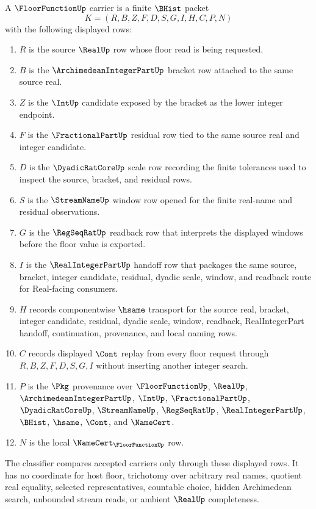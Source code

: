 \begin{definition}
\label{def:floor-function-carrier}
A $\FloorFunctionUp$ carrier is a finite $\BHist$ packet
$$
K=(R,B,Z,F,D,S,G,I,H,C,P,N)
$$
with the following displayed rows:
\begin{enumerate}
\item $R$ is the source $\RealUp$ row whose floor read is being requested.
\item $B$ is the $\ArchimedeanIntegerPartUp$ bracket row attached to the same source real.
\item $Z$ is the $\IntUp$ candidate exposed by the bracket as the lower integer endpoint.
\item $F$ is the $\FractionalPartUp$ residual row tied to the same source real and integer candidate.
\item $D$ is the $\DyadicRatCoreUp$ scale row recording the finite tolerances used to inspect the source, bracket, and residual rows.
\item $S$ is the $\StreamNameUp$ window row opened for the finite real-name and residual observations.
\item $G$ is the $\RegSeqRatUp$ readback row that interprets the displayed windows before the floor value is exported.
\item $I$ is the $\RealIntegerPartUp$ handoff row that packages the same source, bracket, integer candidate, residual, dyadic scale, window, and readback route for Real-facing consumers.
\item $H$ records componentwise $\hsame$ transport for the source real, bracket, integer candidate, residual, dyadic scale, window, readback, RealIntegerPart handoff, continuation, provenance, and local naming rows.
\item $C$ records displayed $\Cont$ replay from every floor request through $R,B,Z,F,D,S,G,I$ without inserting another integer search.
\item $P$ is the $\Pkg$ provenance over $\FloorFunctionUp$, $\RealUp$, $\ArchimedeanIntegerPartUp$, $\IntUp$, $\FractionalPartUp$, $\DyadicRatCoreUp$, $\StreamNameUp$, $\RegSeqRatUp$, $\RealIntegerPartUp$, $\BHist$, $\hsame$, $\Cont$, and $\NameCert$.
\item $N$ is the local $\NameCert_{\FloorFunctionUp}$ row.
\end{enumerate}
The classifier compares accepted carriers only through these displayed rows. It has no coordinate for host floor, trichotomy over arbitrary real names, quotient real equality, selected representatives, countable choice, hidden Archimedean search, unbounded stream reads, or ambient $\RealUp$ completeness.
\end{definition}

